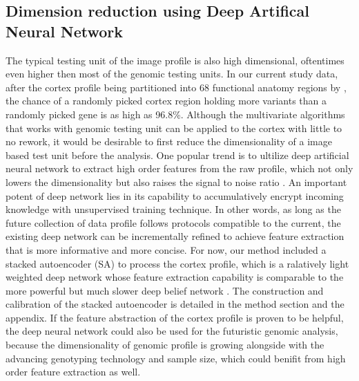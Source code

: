 \subsection{Dimension reduction using Deep Artifical Neural Network}
The typical testing unit of the image profile is also high dimensional, oftentimes even higher then most of the genomic testing units. In our current study data, after the cortex profile being partitioned into 68 functional anatomy regions by \FS, the chance of a randomly picked cortex region holding more variants than a randomly picked gene is as high as 96.8\%. Although the multivariate algorithms that works with genomic testing unit can be applied to the cortex with little to no rework, it would be desirable to first reduce the dimensionality of a image based test unit before the analysis. One popular trend is to ultilize deep artificial neural network to extract high order features from the raw profile, which not only lowers the dimensionality but also raises the signal to noise ratio \cite{DL:Intro1}. An important potent of deep network lies in its capability to accumulatively encrypt incoming knowledge with unsupervised training technique. In other words, as long as the future collection of data profile follows protocols compatible to the current, the existing deep network can be incrementally refined to achieve feature extraction that is more informative and more concise. For now, our method included a stacked autoencoder (SA) to process the cortex profile, which is a ralatively light weighted deep network whose feature extraction capability is comparable to the more powerful but much slower deep belief network \cite{DL:SDA1, DL:Intro2}. The construction and calibration of the stacked autoencoder is detailed in the method section and the appendix. If the feature abstraction of the cortex profile is proven to be helpful, the deep neural network could also be used for the futuristic genomic analysis, because the dimensionality of genomic profile is growing alongside with the advancing genotyping technology and sample size, which could benifit from high order feature extraction as well.

